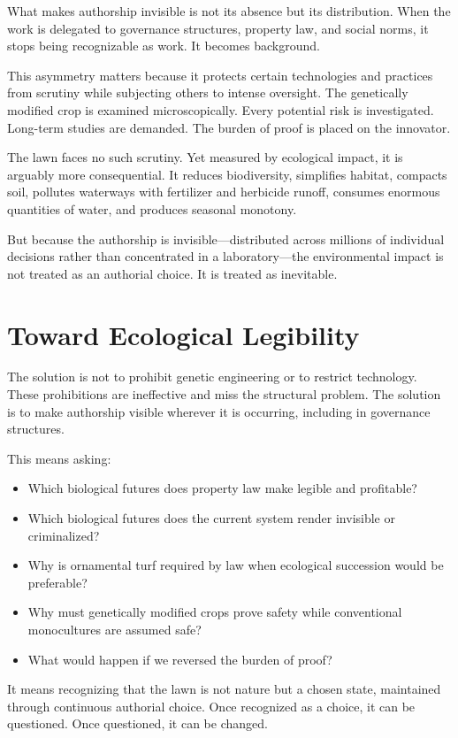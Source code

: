 \documentclass[12pt]{article}
\begin{document}
What makes authorship invisible is not its absence but its distribution. When the work is delegated to governance structures, property law, and social norms, it stops being recognizable as work. It becomes background.

This asymmetry matters because it protects certain technologies and practices from scrutiny while subjecting others to intense oversight. The genetically modified crop is examined microscopically. Every potential risk is investigated. Long-term studies are demanded. The burden of proof is placed on the innovator.

The lawn faces no such scrutiny. Yet measured by ecological impact, it is arguably more consequential. It reduces biodiversity, simplifies habitat, compacts soil, pollutes waterways with fertilizer and herbicide runoff, consumes enormous quantities of water, and produces seasonal monotony.

But because the authorship is invisible---distributed across millions of individual decisions rather than concentrated in a laboratory---the environmental impact is not treated as an authorial choice. It is treated as inevitable.

\section{Toward Ecological Legibility}

The solution is not to prohibit genetic engineering or to restrict technology. These prohibitions are ineffective and miss the structural problem. The solution is to make authorship visible wherever it is occurring, including in governance structures.

This means asking:

\begin{itemize}
\item Which biological futures does property law make legible and profitable?
\item Which biological futures does the current system render invisible or criminalized?
\item Why is ornamental turf required by law when ecological succession would be preferable?
\item Why must genetically modified crops prove safety while conventional monocultures are assumed safe?
\item What would happen if we reversed the burden of proof?
\end{itemize}

It means recognizing that the lawn is not nature but a chosen state, maintained through continuous authorial choice. Once recognized as a choice, it can be questioned. Once questioned, it can be changed.
\end{document}
